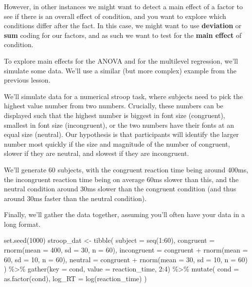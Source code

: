 \documentclass[
]{book}
\newenvironment{Shaded}{\begin{snugshade}}{\end{snugshade}}
\newcommand{\AttributeTok}[1]{\textcolor[rgb]{0.77,0.63,0.00}{#1}}
\newcommand{\DecValTok}[1]{\textcolor[rgb]{0.00,0.00,0.81}{#1}}
\newcommand{\FunctionTok}[1]{\textcolor[rgb]{0.00,0.00,0.00}{#1}}
\newcommand{\NormalTok}[1]{#1}
\newcommand{\OtherTok}[1]{\textcolor[rgb]{0.56,0.35,0.01}{#1}}
\newcommand{\SpecialCharTok}[1]{\textcolor[rgb]{0.00,0.00,0.00}{#1}}
\begin{document}
However, in other instances we might want to detect a main effect of a factor to see if there is an overall effect of condition, and you want to explore which conditions differ after the fact. In this case, we might want to use \textbf{deviation} or \textbf{sum} coding for our factors, and as such we want to test for the \textbf{main effect} of condition.

To explore main effects for the ANOVA and for the multilevel regression, we'll simulate some data. We'll use a similar (but more complex) example from the previous lesson.

We'll simulate data for a numerical stroop task, where subjects need to pick the highest value number from two numbers. Crucially, these numbers can be displayed such that the highest number is biggest in font size (congruent), smallest in font size (incongruent), or the two numbers have their fonts at an equal size (neutral). Our hypothesis is that participants will identify the larger number most quickly if the size and magnitude of the number of congruent, slower if they are neutral, and slowest if they are incongruent.

We'll generate 60 subjects, with the congruent reaction time being around 400ms, the incongruent reaction time being on average 60ms slower than this, and the neutral condition around 30ms slower than the congruent condition (and thus around 30ms faster than the neutral condition).

Finally, we'll gather the data together, assuming you'll often have your data in a long format.

\begin{Shaded}
\begin{Highlighting}[]
\FunctionTok{set.seed}\NormalTok{(}\DecValTok{1000}\NormalTok{)}
\NormalTok{stroop\_dat }\OtherTok{\textless{}{-}} \FunctionTok{tibble}\NormalTok{(}
  \AttributeTok{subject =} \FunctionTok{seq}\NormalTok{(}\DecValTok{1}\SpecialCharTok{:}\DecValTok{60}\NormalTok{),}
  \AttributeTok{congruent =} \FunctionTok{rnorm}\NormalTok{(}\AttributeTok{mean =} \DecValTok{400}\NormalTok{, }\AttributeTok{sd =} \DecValTok{30}\NormalTok{, }\AttributeTok{n =} \DecValTok{60}\NormalTok{),}
  \AttributeTok{incongruent =}\NormalTok{ congruent }\SpecialCharTok{+} \FunctionTok{rnorm}\NormalTok{(}\AttributeTok{mean =} \DecValTok{60}\NormalTok{, }\AttributeTok{sd =} \DecValTok{10}\NormalTok{, }\AttributeTok{n =} \DecValTok{60}\NormalTok{),}
  \AttributeTok{neutral =}\NormalTok{ congruent }\SpecialCharTok{+} \FunctionTok{rnorm}\NormalTok{(}\AttributeTok{mean =} \DecValTok{30}\NormalTok{, }\AttributeTok{sd =} \DecValTok{10}\NormalTok{, }\AttributeTok{n =} \DecValTok{60}\NormalTok{)}
\NormalTok{  ) }\SpecialCharTok{\%\textgreater{}\%}
  \FunctionTok{gather}\NormalTok{(}\AttributeTok{key =}\NormalTok{ cond, }\AttributeTok{value =}\NormalTok{ reaction\_time, }\DecValTok{2}\SpecialCharTok{:}\DecValTok{4}\NormalTok{) }\SpecialCharTok{\%\textgreater{}\%} 
  \FunctionTok{mutate}\NormalTok{(}
    \AttributeTok{cond =} \FunctionTok{as.factor}\NormalTok{(cond),}
    \AttributeTok{log\_RT =} \FunctionTok{log}\NormalTok{(reaction\_time)}
\NormalTok{  )}
\end{Highlighting}
\end{Shaded}
\end{document}
